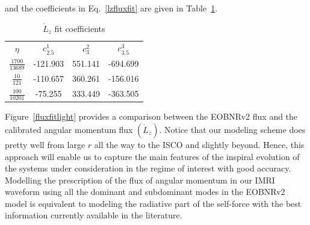\noindent and the coefficients in Eq.~\eqref{lzfluxfit} are given in Table~\ref{Lzdotcoef}.

\begin{table}[ht]
\centering
\begin{tabular}{c c c c}
\hline\hline
  $\eta$& $c^1_{2.5}$ & $c^2_{3}$ & $c^3_{3.5}$   \\  
    $\frac{1700}{13689}$& -121.903 & 551.141 &-694.699  \\ [1ex]
   $\frac{10}{121}$& -110.657 & 360.261 &-156.016 \\ [1ex]
    $\frac{100}{10201}$&-75.255 & 333.449 & -363.505  \\ [1ex]
\hline
\end{tabular}
\caption{\(\dot{L}_z\) fit coefficients}
\label{Lzdotcoef}
\end{table}


Figure~\ref{fluxfitlight} provides a comparison between the EOBNRv2 flux and the calibrated angular momentum flux \(\left(\dot L_z\right)\). Notice that our modeling scheme does pretty well from large \(r\) all the way to the ISCO and slightly beyond. Hence, this approach will enable us to capture the main features of the inspiral evolution of the systems under consideration in the regime of interest with good accuracy. Modelling the prescription of the flux of angular momentum in our IMRI waveform using all the dominant and subdominant modes in the EOBNRv2 model is equivalent to modeling the radiative part of the self-force with the best information currently available in the literature. 



